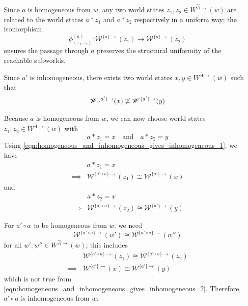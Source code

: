 \begin{proofE}
\begin{enumerate}
    Since $a$ is homogeneous from $w$, any two world states $z_{1}, z_{2} \in W^{\hat{A}\to}(w)$ are related to the world states $a \ast z_{1}$ and $a \ast z_{2}$ respectively in a uniform way; the isomorphism
    \begin{equation}
        \phi^{(a)}_{(z_{1}, z_{2})}: \mathscr{W}^{\{a\}\to}(z_{1}) \to \mathscr{W}^{\{a\}\to}(z_{2})
    \end{equation}
    ensures the passage through $a$ preserves the structural uniformity of the reachable subworlds.

    Since $a'$ is inhomogeneous, there exists two world states $x, y \in W^{\hat{A}\to}(w)$ such that
    \begin{equation}\label{eqn:homogeneous_and_inhomogeneous_gives_inhomogeneous_2}
        \mathscr{W}^{\{a'\}\to}(x) \centernot\cong \mathscr{W}^{\{a'\}\to}(y)
    \end{equation}

    Because $a$ is homogeneous from $w$, we can now choose world states $z_{1}, z_{2} \in W^{\hat{A}\to}(w)$ with
    \begin{equation}
        a \ast z_{1} = x \quad \text{and} \quad a \ast z_{2} = y
    \end{equation}
    Using \cref{eqn:homogeneous_and_inhomogeneous_gives_inhomogeneous_1}, we have
    \begin{align}
        & a \ast z_{1} = x \\
        \implies & \mathscr{W}^{\{a' \circ a\}\to}(z_{1}) \cong \mathscr{W}^{\{a'\}\to}(x)
    \end{align}
    and
    \begin{align}
        & a \ast z_{2} = x \\
        \implies & \mathscr{W}^{\{a' \circ a\}\to}(z_{2}) \cong \mathscr{W}^{\{a'\}\to}(y)
    \end{align}

    For $a' \circ a$ to be homogeneous from $w$, we need
    \begin{equation}
        \mathscr{W}^{\{a' \circ a\}\to}(w') \cong \mathscr{W}^{\{a' \circ a\}\to}(w'') 
    \end{equation}
    for all $w',w'' \in W^{\hat{A}\to}(w)$; this includes
    \begin{align}
        & \mathscr{W}^{\{a' \circ a\}\to}(z_{1}) \cong \mathscr{W}^{\{a' \circ a\}\to}(z_{2}) \\
        \implies & \mathscr{W}^{\{a'\}\to}(x) \cong \mathscr{W}^{\{a'\}\to}(y)
    \end{align}
    which is not true from \cref{eqn:homogeneous_and_inhomogeneous_gives_inhomogeneous_2}.
    Therefore, $a' \circ a$ is inhomogeneous from $w$.



\end{enumerate}
\end{proofE}
